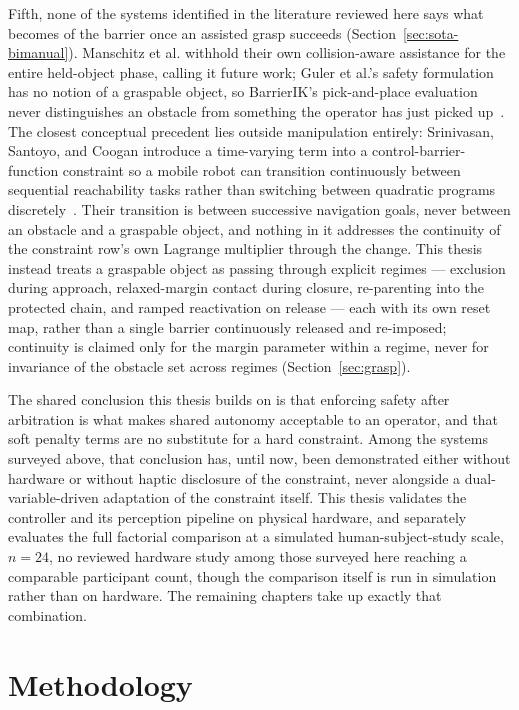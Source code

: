 \documentclass[12pt,a4paper,twoside,openright]{report}
\begin{document}
Fifth, none of the systems identified in the literature reviewed here says what becomes of the barrier once an assisted grasp succeeds (Section~\ref{sec:sota-bimanual}). Manschitz et al. withhold their own collision-aware assistance for the entire held-object phase, calling it future work; Guler et al.'s safety formulation has no notion of a graspable object, so BarrierIK's pick-and-place evaluation never distinguishes an obstacle from something the operator has just picked up~\cite{manschitz2025samplinggrasp,guler2026barrierik}. The closest conceptual precedent lies outside manipulation entirely: Srinivasan, Santoyo, and Coogan introduce a time-varying term into a control-barrier-function constraint so a mobile robot can transition continuously between sequential reachability tasks rather than switching between quadratic programs discretely~\cite{srinivasan2020continuous}. Their transition is between successive navigation goals, never between an obstacle and a graspable object, and nothing in it addresses the continuity of the constraint row's own Lagrange multiplier through the change. This thesis instead treats a graspable object as passing through explicit regimes --- exclusion during approach, relaxed-margin contact during closure, re-parenting into the protected chain, and ramped reactivation on release --- each with its own reset map, rather than a single barrier continuously released and re-imposed; continuity is claimed only for the margin parameter within a regime, never for invariance of the obstacle set across regimes (Section~\ref{sec:grasp}).



The shared conclusion this thesis builds on is that enforcing safety after arbitration is what makes shared autonomy acceptable to an operator, and that soft penalty terms are no substitute for a hard constraint. Among the systems surveyed above, that conclusion has, until now, been demonstrated either without hardware or without haptic disclosure of the constraint, never alongside a dual-variable-driven adaptation of the constraint itself. This thesis validates the controller and its perception pipeline on physical hardware, and separately evaluates the full factorial comparison at a simulated human-subject-study scale, $n=24$, no reviewed hardware study among those surveyed here reaching a comparable participant count, though the comparison itself is run in simulation rather than on hardware. The remaining chapters take up exactly that combination.


\chapter{Methodology}
\label{ch:method}
\end{document}
